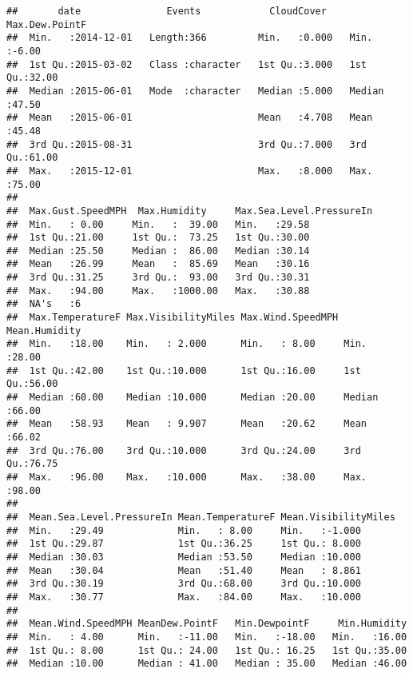 \documentclass[]{article}
\begin{document}
\begin{verbatim}
##       date               Events            CloudCover    Max.Dew.PointF 
##  Min.   :2014-12-01   Length:366         Min.   :0.000   Min.   :-6.00  
##  1st Qu.:2015-03-02   Class :character   1st Qu.:3.000   1st Qu.:32.00  
##  Median :2015-06-01   Mode  :character   Median :5.000   Median :47.50  
##  Mean   :2015-06-01                      Mean   :4.708   Mean   :45.48  
##  3rd Qu.:2015-08-31                      3rd Qu.:7.000   3rd Qu.:61.00  
##  Max.   :2015-12-01                      Max.   :8.000   Max.   :75.00  
##                                                                         
##  Max.Gust.SpeedMPH  Max.Humidity     Max.Sea.Level.PressureIn
##  Min.   : 0.00     Min.   :  39.00   Min.   :29.58           
##  1st Qu.:21.00     1st Qu.:  73.25   1st Qu.:30.00           
##  Median :25.50     Median :  86.00   Median :30.14           
##  Mean   :26.99     Mean   :  85.69   Mean   :30.16           
##  3rd Qu.:31.25     3rd Qu.:  93.00   3rd Qu.:30.31           
##  Max.   :94.00     Max.   :1000.00   Max.   :30.88           
##  NA's   :6                                                   
##  Max.TemperatureF Max.VisibilityMiles Max.Wind.SpeedMPH Mean.Humidity  
##  Min.   :18.00    Min.   : 2.000      Min.   : 8.00     Min.   :28.00  
##  1st Qu.:42.00    1st Qu.:10.000      1st Qu.:16.00     1st Qu.:56.00  
##  Median :60.00    Median :10.000      Median :20.00     Median :66.00  
##  Mean   :58.93    Mean   : 9.907      Mean   :20.62     Mean   :66.02  
##  3rd Qu.:76.00    3rd Qu.:10.000      3rd Qu.:24.00     3rd Qu.:76.75  
##  Max.   :96.00    Max.   :10.000      Max.   :38.00     Max.   :98.00  
##                                                                        
##  Mean.Sea.Level.PressureIn Mean.TemperatureF Mean.VisibilityMiles
##  Min.   :29.49             Min.   : 8.00     Min.   :-1.000      
##  1st Qu.:29.87             1st Qu.:36.25     1st Qu.: 8.000      
##  Median :30.03             Median :53.50     Median :10.000      
##  Mean   :30.04             Mean   :51.40     Mean   : 8.861      
##  3rd Qu.:30.19             3rd Qu.:68.00     3rd Qu.:10.000      
##  Max.   :30.77             Max.   :84.00     Max.   :10.000      
##                                                                  
##  Mean.Wind.SpeedMPH MeanDew.PointF   Min.DewpointF     Min.Humidity  
##  Min.   : 4.00      Min.   :-11.00   Min.   :-18.00   Min.   :16.00  
##  1st Qu.: 8.00      1st Qu.: 24.00   1st Qu.: 16.25   1st Qu.:35.00  
##  Median :10.00      Median : 41.00   Median : 35.00   Median :46.00  

\end{verbatim}
\end{document}
